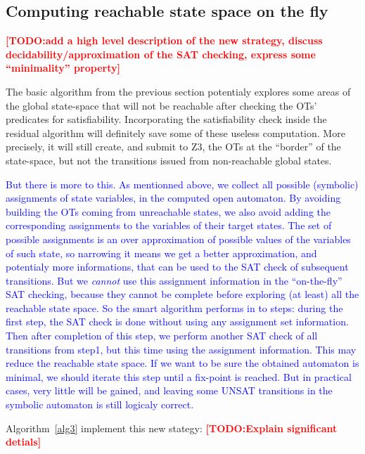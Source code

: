 \documentclass[smallcondensed]{svjour3}
\newcommand{\TODO}[1]{\textcolor{red}{\textbf{[TODO:#1]}}}
\newcommand{\ERIC}[1]{\textcolor{blue}{#1}}
\begin{document}
\subsection{Computing reachable state space on the fly}
\TODO{add a high level description of the new strategy, discuss
  decidability/approximation of the SAT checking, express some
  ``minimality'' property}

The basic algorithm from the previous section potentialy explores some
areas of the global state-space that will not be reachable after
checking the OTs' predicates for satisfiability. Incorporating the
satisfiability check inside the residual algorithm will definitely
save some of these useless computation. More precisely, it will still
create, and submit to Z3, the OTs at the ``border'' of the state-space, but
not the transitions issued from non-reachable global states.

\ERIC{But there is more to this. As mentionned above, we collect all
possible (symbolic) assignments of state variables, in the
computed open automaton. By avoiding building the OTs coming from
unreachable states, we also avoid adding the corresponding assignments
to the variables of their target states. The set of possible
assignments is an over approximation of possible values of the
variables of such state, so narrowing it means we get a better
approximation, and potentialy more informations, that can be used to
the SAT check of subsequent transitions. But we \emph{cannot} use this
assignment information in the ``on-the-fly'' SAT checking, because
they cannot be complete before exploring (at least) all the reachable
state space. So the smart algorithm performs in to steps: during the
first step, the SAT check is done without using any assignment set
information. Then after completion of this step, we perform another
SAT check of all transitions from step1, but this time using the
assignment information. This may reduce the reachable state space. If
we want to be sure the obtained automaton is minimal, we should
iterate this step until a fix-point is reached. But in practical cases, very
little will be gained, and leaving some UNSAT transitions in the
symbolic automaton is still logicaly correct.}


Algorithm~\ref{alg3} implement this new stategy: \TODO{Explain
  significant detials}
\end{document}
